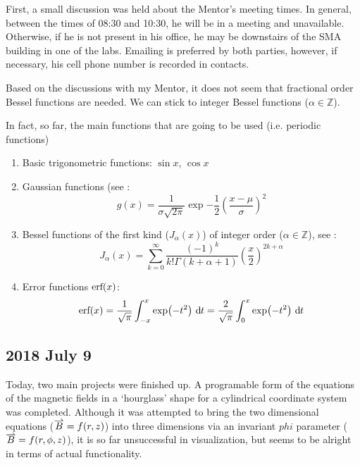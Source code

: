 \documentclass[twocolumn]{article}
\begin{document}
\begin{meetingnotes*}
	First, a small discussion was held about the Mentor's meeting times. In general, between the times of 08:30 and 10:30, he will be in a meeting and unavailable. Otherwise, if he is not present in his office, he may be downstairs of the SMA building in one of the labs. Emailing is preferred by both parties, however, if necessary, his cell phone number is recorded in contacts.

	Based on the discussions with my Mentor, it does not seem that fractional order Bessel functions are needed. We can stick to integer Bessel functions ($\alpha \in \mathbb{Z}$). 

	In fact, so far, the main functions that are going to be used (i.e. periodic functions)
	\begin{enumerate}
		\item Basic trigonometric functions: $\sin{x}$, $\cos{x}$
		\item Gaussian functions (see : 
			\begin{equation*}
				g(x) = \frac{1}{\sigma \sqrt{2 \pi}} \exp{ -\frac{1}{2} \left(\frac{x-\mu}{\sigma}\right)^2 }
			\end{equation*}
		\item Bessel functions of the first kind ($J_\alpha(x)$) of integer order ($\alpha \in \mathbb{Z}$), see :
			\begin{equation*}
				J_{\alpha}(x) = \sum_{k=0}^{\infty} \frac{\left(-1\right)^{k}}{k! \Gamma(k+\alpha+1)} \left( \frac{x}{2} \right)^{2k + \alpha}
			\end{equation*}
		\item Error functions $\text{erf} \! \left( x \right)$:
			\begin{equation*}
				\erf{x} = \frac{1}{\sqrt{\pi}} \int_{-x}^{x} \exp{-t^2} \diff{t} = \frac{2}{\sqrt{\pi}} \int_{0}^{x} \exp{-t^2} \diff{t}
				\label{eq:error_function}
			\end{equation*}
	\end{enumerate}
\end{meetingnotes*}


\subsection{2018 July 9}
\label{subsec:2018_July_9}

Today, two main projects were finished up. A programable form of the equations of the magnetic fields in a `hourglass' shape for a cylindrical coordinate system was completed. Although it was attempted to bring the two dimensional equations ($\vect{B} = f(r,z)$) into three dimensions via an invariant $phi$ parameter ($\vect{B} = f(r,\phi,z)$), it is so far unsuccessful in visualization, but seems to be alright in terms of actual functionality.
\end{document}
